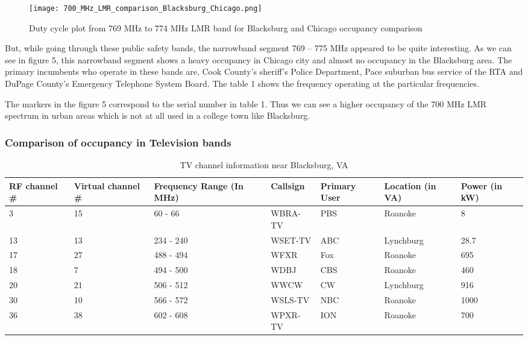 \documentclass[12pt,sts]{report}
\begin{document}
	\begin{figure}[ht!]
		\centering
			\texttt{[image: 700\_MHz\_LMR\_comparison\_Blacksburg\_Chicago.png]}
		\caption{Duty cycle plot from 769 MHz to 774 MHz LMR band for Blacksburg and Chicago occupancy comparison}
	\end{figure}
	
	But, while going through these public safety bands, the narrowband segment 769 – 775 MHz appeared to be quite interesting. As we can see in figure 5, this narrowband segment shows a heavy occupancy in Chicago city and almost no occupancy in the Blacksburg area. The primary incumbents who operate in these bands are, Cook County’s sheriff’s Police Department, Pace suburban bus service of the RTA and DuPage County’s Emergency Telephone System Board. The table 1 shows the frequency operating at the particular frequencies.
	
	The markers in the figure 5 correspond to the serial number in table 1. Thus we can see a higher occupancy of the 700 MHz LMR spectrum in urban areas which is not at all used in a college town like Blacksburg.
	
	\subsubsection{Comparison of occupancy in Television bands}
	
	\begin{table}[h!]
		\begin{tabular}{| p{2cm} | p{2cm} | p{3cm} | p{2cm} | p{2cm} | p{2cm} | p{2cm} |}
		\hline
		RF channel \#	& Virtual channel \#	& Frequency Range (In MHz)	& Callsign 	& Primary User 	& Location (in VA) & Power (in kW) \\	\hline
		
		3 &	15 & 60 - 66 & WBRA-TV & PBS & Roanoke & 8 \\ \hline
		13 & 13 & 234 - 240 & WSET-TV &	ABC & Lynchburg	& 28.7 \\ \hline
		17 & 27 & 488 - 494 & WFXR & Fox & Roanoke & 695 \\ \hline
		18 & 7 & 494 - 500 & WDBJ & CBS &	Roanoke &	460 \\	\hline
		20 & 21 & 506 - 512 & WWCW & CW & Lynchburg	&	916 \\	\hline
		30 & 10 & 566 - 572 &	WSLS-TV &	NBC &	Roanoke & 1000 \\	\hline
		36 & 38 & 602 - 608 & WPXR-TV & ION & Roanoke & 700 \\
		\hline
		\end{tabular}
		\caption{TV channel information near Blacksburg, VA}
	\end{table}
	
\end{document}
